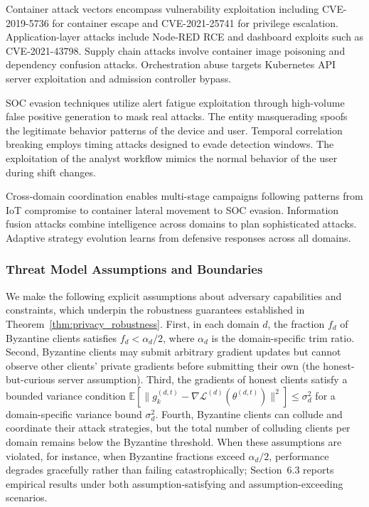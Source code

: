 \documentclass[12pt,a4paper]{article}
\theoremstyle{definition}
\newcommand{\E}{\mathbb{E}}
\begin{document}
Container attack vectors encompass vulnerability exploitation including CVE-2019-5736 for container escape and CVE-2021-25741 for privilege escalation. Application-layer attacks include Node-RED RCE and dashboard exploits such as CVE-2021-43798. Supply chain attacks involve container image poisoning and dependency confusion attacks. Orchestration abuse targets Kubernetes API server exploitation and admission controller bypass.

SOC evasion techniques utilize alert fatigue exploitation through high-volume false positive generation to mask real attacks. The entity masquerading spoofs the legitimate behavior patterns of the device and user. Temporal correlation breaking employs timing attacks designed to evade detection windows. The exploitation of the analyst workflow mimics the normal behavior of the user during shift changes.

Cross-domain coordination enables multi-stage campaigns following patterns from IoT compromise to container lateral movement to SOC evasion. Information fusion attacks combine intelligence across domains to plan sophisticated attacks. Adaptive strategy evolution learns from defensive responses across all domains.

\subsubsection{Threat Model Assumptions and Boundaries}
\label{sec:threat_assumptions}
We make the following explicit assumptions about adversary capabilities and constraints, which underpin the robustness guarantees established in Theorem~\ref{thm:privacy_robustness}. First, in each domain $d$, the fraction $f_d$ of Byzantine clients satisfies $f_d < \alpha_d/2$, where $\alpha_d$ is the domain-specific trim ratio. Second, Byzantine clients may submit arbitrary gradient updates but cannot observe other clients' private gradients before submitting their own (the honest-but-curious server assumption). Third, the gradients of honest clients satisfy a bounded variance condition $\E[\|g_k^{(d,t)} - \nabla \mathcal{L}^{(d)}(\theta^{(d,t)})\|^2] \leq \sigma_d^2$ for a domain-specific variance bound $\sigma_d^2$. Fourth, Byzantine clients can collude and coordinate their attack strategies, but the total number of colluding clients per domain remains below the Byzantine threshold. When these assumptions are violated, for instance, when Byzantine fractions exceed $\alpha_d/2$, performance degrades gracefully rather than failing catastrophically; Section~6.3 reports empirical results under both assumption-satisfying and assumption-exceeding scenarios.
\end{document}
